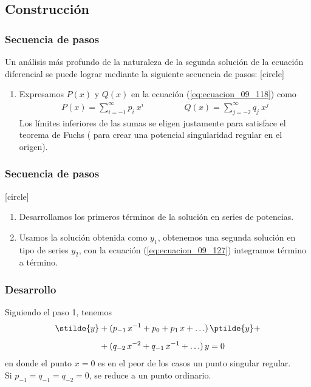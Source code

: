 \subsection{Construcción}
\begin{frame}
\frametitle{Secuencia de pasos}
Un análisis más profundo de la naturaleza de la segunda solución de la ecuación diferencial se puede lograr mediante la siguiente secuencia de pasos:
[circle]
\begin{enumerate}
\item Expresamos $P(x)$ y $Q(x)$ en la ecuación (\ref{eq:ecuacion_09_118}) como
\begin{align}
P(x) = \sum_{i=-1}^{\infty} p_{i} \: x^{i} \hspace{2cm} Q(x) = \sum_{j=-2}^{\infty} q_{j} \: x^{j}
\label{eq:ecuacion_09_129}
\end{align}
Los límites inferiores de las sumas se eligen justamente para satisface el teorema de Fuchs ( para crear una potencial singularidad regular en el origen).
\seti
\end{enumerate}
\end{frame}
\begin{frame}
\frametitle{Secuencia de pasos}
[circle]
\begin{enumerate}[<+->]
\conti
\item Desarrollamos los primeros términos de la solución en series de potencias.
\item Usamos la solución obtenida como $y_{1}$, obtenemos una segunda solución en tipo de series $y_{2}$, con la ecuación (\ref{eq:ecuacion_09_127}) integramos término a término.
\end{enumerate}
\end{frame}
\begin{frame}
\frametitle{Desarrollo}
Siguiendo el paso 1, tenemos
\begin{align}
\begin{aligned}[b]
\stilde{y} &+ (p_{-1} \, x^{-1} + p_{0} + p_{1} \, x + \ldots) \, \ptilde{y} + \\[0.5em]
&+(q_{-2} \, x^{-2} + q_{-1} \, x^{-1} + \ldots) \, y = 0
\end{aligned}
\label{eq:ecuacion_09_130}
\end{align}
en donde el punto $x = 0$ es en el peor de los casos un punto singular regular.
\\
\bigskip
Si $p_{-1} = q_{-1} = q_{-2} = 0$, se reduce a un punto ordinario.
\end{frame}
